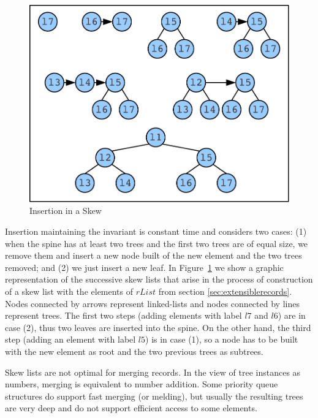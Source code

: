 \documentclass[natbib]{sigplanconf}
\newcommand{\Varid}[1]{\mathit{#1}}
\begin{document}
\begin{figure}[thp]
\begin{center}
\includegraphics[scale=0.5]{insert.pdf}
\end{center}
\caption{Insertion in a Skew} \label{fig:insert}
\end{figure}

Insertion maintaining the invariant is constant time
and considers two cases: 
(1) when the spine has at least two trees
and the first two trees are of equal size,
we remove them and insert a new node built
of the new element and the two trees removed; and
(2) we just insert a new leaf.
In Figure~\ref{fig:insert} we show a graphic representation of
the successive skew lists that arise in the process of construction of a skew list with the elements of \ensuremath{\Varid{rList}} from section \ref{sec:extensiblerecords}.
Nodes connected by arrows represent linked-lists and nodes connected by lines represent trees.
The first two steps (adding elements with label \ensuremath{\Varid{l7}} and \ensuremath{\Varid{l6}}) are in case (2), 
thus two leaves are inserted into the spine. 
On the other hand, the third step (adding an element with label \ensuremath{\Varid{l5}}) is in case (1), so a node has to be built with the new element as root and the two previous trees as subtrees.

Skew lists are not optimal for merging records.  In the view of tree
instances as numbers, merging is equivalent to number addition.  Some
priority queue structures do support fast merging (or melding), but
usually the resulting trees are very deep and do not support efficient
access to some elements.
\end{document}
